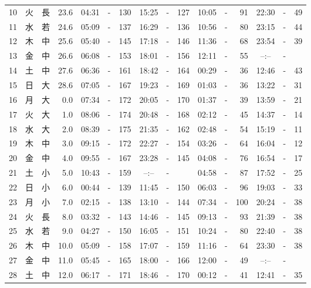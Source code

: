 \documentclass[12pt.a4j]{jsarticle}
\begin{document}
\begin{center}
\begin{table}[ht]
\begin{tabular}{|rc|cr|ccrccr|ccrccr|}
10 & 火 & 長 & 23.6 &  04:31 &-& 130  &  15:25 &-& 127  &   10:05 &-&  91  &   22:30 &-&  49  \\
11 & 水 & 若 & 24.6 &  05:09 &-& 137  &  16:29 &-& 136  &   10:56 &-&  80  &   23:15 &-&  44  \\
12 & 木 & 中 & 25.6 &  05:40 &-& 145  &  17:18 &-& 146  &   11:36 &-&  68  &   23:54 &-&  39  \\
13 & 金 & 中 & 26.6 &  06:08 &-& 153  &  18:01 &-& 156  &   12:11 &-&  55  &   --:-- &-&     \\
14 & 土 & 中 & 27.6 &  06:36 &-& 161  &  18:42 &-& 164  &   00:29 &-&  36  &   12:46 &-&  43  \\
15 & 日 & 大 & 28.6 &  07:05 &-& 167  &  19:23 &-& 169  &   01:03 &-&  36  &   13:22 &-&  31  \\
16 & 月 & 大 &  0.0 &  07:34 &-& 172  &  20:05 &-& 170  &   01:37 &-&  39  &   13:59 &-&  21  \\
17 & 火 & 大 &  1.0 &  08:06 &-& 174  &  20:48 &-& 168  &   02:12 &-&  45  &   14:37 &-&  14  \\
18 & 水 & 大 &  2.0 &  08:39 &-& 175  &  21:35 &-& 162  &   02:48 &-&  54  &   15:19 &-&  11  \\
19 & 木 & 中 &  3.0 &  09:15 &-& 172  &  22:27 &-& 154  &   03:26 &-&  64  &   16:04 &-&  12  \\
20 & 金 & 中 &  4.0 &  09:55 &-& 167  &  23:28 &-& 145  &   04:08 &-&  76  &   16:54 &-&  17  \\
21 & 土 & 小 &  5.0 &  10:43 &-& 159  &  --:-- &-&     &   04:58 &-&  87  &   17:52 &-&  25  \\
22 & 日 & 小 &  6.0 &  00:44 &-& 139  &  11:45 &-& 150  &   06:03 &-&  96  &   19:03 &-&  33  \\
23 & 月 & 小 &  7.0 &  02:15 &-& 138  &  13:10 &-& 144  &   07:34 &-& 100  &   20:24 &-&  38  \\
24 & 火 & 長 &  8.0 &  03:32 &-& 143  &  14:46 &-& 145  &   09:13 &-&  93  &   21:39 &-&  38  \\
25 & 水 & 若 &  9.0 &  04:27 &-& 150  &  16:05 &-& 151  &   10:24 &-&  80  &   22:40 &-&  38  \\
26 & 木 & 中 & 10.0 &  05:09 &-& 158  &  17:07 &-& 159  &   11:16 &-&  64  &   23:30 &-&  38  \\
27 & 金 & 中 & 11.0 &  05:45 &-& 165  &  18:00 &-& 166  &   12:00 &-&  49  &   --:-- &-&     \\
28 & 土 & 中 & 12.0 &  06:17 &-& 171  &  18:46 &-& 170  &   00:12 &-&  41  &   12:41 &-&  35  \\

\end{tabular}
\end{table}
\end{center}
\end{document}
